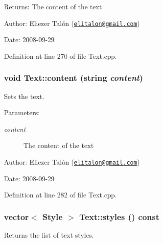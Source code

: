 \begin{Desc}
\item[Returns:]The content of the text\end{Desc}
\begin{Desc}
\item[Author:]Eliezer Talón (\href{mailto:elitalon@gmail.com}{\tt elitalon@gmail.com}) \end{Desc}
\begin{Desc}
\item[Date:]2008-09-29 \end{Desc}


Definition at line 270 of file Text.cpp.\hypertarget{class_text_7caede09aa76ca7fc26aab3ec3c41181}{
\subsubsection[content]{\setlength{\rightskip}{0pt plus 5cm}void Text::content (string {\em content})}}
\label{class_text_7caede09aa76ca7fc26aab3ec3c41181}


Sets the text. 

\begin{Desc}
\item[Parameters:]
\begin{description}
\item[{\em content}]The content of the text\end{description}
\end{Desc}
\begin{Desc}
\item[Author:]Eliezer Talón (\href{mailto:elitalon@gmail.com}{\tt elitalon@gmail.com}) \end{Desc}
\begin{Desc}
\item[Date:]2008-09-29 \end{Desc}


Definition at line 282 of file Text.cpp.\hypertarget{class_text_a66bfa36621592ccbeda7968637d7301}{
\subsubsection[styles]{\setlength{\rightskip}{0pt plus 5cm}vector$<$ {\bf Style} $>$ Text::styles () const}}
\label{class_text_a66bfa36621592ccbeda7968637d7301}


Returns the list of text styles. 

